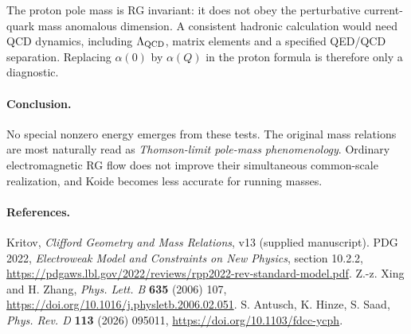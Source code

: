 \documentclass[10pt,a4paper]{article}
\begin{document}
The proton pole mass is RG invariant: it does not obey the perturbative current-quark mass anomalous dimension. A consistent hadronic calculation would need QCD dynamics, including $\Lambda_{\rm QCD}$, matrix elements and a specified QED/QCD separation. Replacing $\alpha(0)$ by $\alpha(Q)$ in the proton formula is therefore only a diagnostic.
\paragraph{Conclusion.} No special nonzero energy emerges from these tests. The original mass relations are most naturally read as \emph{Thomson-limit pole-mass phenomenology}. Ordinary electromagnetic RG flow does not improve their simultaneous common-scale realization, and Koide becomes less accurate for running masses.
\paragraph{References.} Kritov, \emph{Clifford Geometry and Mass Relations}, v13 (supplied manuscript). PDG 2022, \emph{Electroweak Model and Constraints on New Physics}, section 10.2.2, \url{https://pdgaws.lbl.gov/2022/reviews/rpp2022-rev-standard-model.pdf}. Z.-z. Xing and H. Zhang, \emph{Phys. Lett. B} \textbf{635} (2006) 107, \url{https://doi.org/10.1016/j.physletb.2006.02.051}. S. Antusch, K. Hinze, S. Saad, \emph{Phys. Rev. D} \textbf{113} (2026) 095011, \url{https://doi.org/10.1103/fdcc-ycph}.
\end{document}
